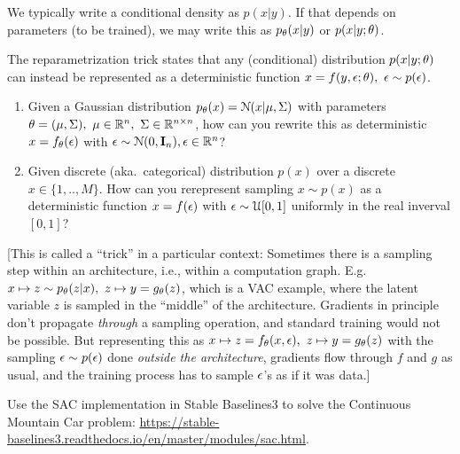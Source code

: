 

We typically write a conditional density as $p(x|y)$. If that depends on parameters (to be trained), we may write this as $p_\theta(x|y)$ or $p(x|y; \theta)$.

The reparametrization trick states that any (conditional) distribution 
$p(x|y; \theta)$ can instead be represented as a deterministic function $x = f(y,\epsilon;\theta),~ \epsilon\sim p(\epsilon)$.

\begin{enumerate}
\item Given a Gaussian distribution $p_\theta(x) = {\cal N}(x|\mu, \Sigma)$ with parameters $\theta=(\mu,\Sigma),~ \mu\in{\mathbb{R}}^n,~ \Sigma \in {\mathbb{R}}^{n\times n}$, how can you rewrite this as deterministic $x = f_\theta(\epsilon)$ with $\epsilon\sim {\cal N}(0,{\rm\bf I}_n), \epsilon\in{\mathbb{R}}^n$?


\item Given discrete (aka.\ categorical) distribution $p(x)$ over a discrete $x\in\{1,..,M\}$. How can you rerepresent sampling $x\sim p(x)$ as a deterministic function $x = f(\epsilon)$ with $\epsilon \sim {\cal U}[0,1]$ uniformly in the real inverval $[0,1]$?


\end{enumerate}

{\scriptsize[This is called a ``trick'' in a particular context: Sometimes there is a sampling step within an architecture, i.e., within a computation graph. E.g. $x \mapsto z \sim p_\theta(z|x),~ z \mapsto y = g_\theta(z)$, which is a VAC example, where the latent variable $z$ is sampled in the ``middle'' of the architecture. Gradients in principle don't propagate \emph{through} a sampling operation, and standard training would not be possible. But representing this as
$x\mapsto z = f_\theta(x,\epsilon),~ z\mapsto y= g_\theta(z)$ with the sampling $\epsilon\sim p(\epsilon)$ done \emph{outside the architecture}, gradients flow through $f$ and $g$ as usual, and the training process has to sample $\epsilon$'s as if it was data.]\par}



Use the SAC implementation in Stable Baselines3 to solve the Continuous Mountain Car problem: {\urlfont\url{https://stable-baselines3.readthedocs.io/en/master/modules/sac.html}}.

